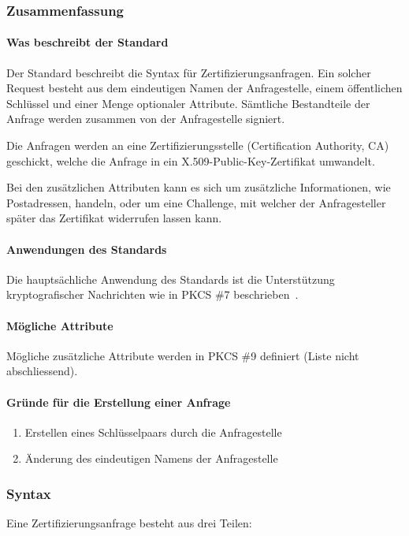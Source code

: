 \documentclass[10pt,a4paper]{article}
\begin{document}
\subsubsection{Zusammenfassung}

\paragraph{Was beschreibt der Standard}
Der Standard beschreibt die Syntax für Zertifizierungsanfragen. Ein solcher Request
besteht aus dem eindeutigen Namen der Anfragestelle, einem öffentlichen Schlüssel und
einer Menge optionaler Attribute. Sämtliche Bestandteile der Anfrage werden zusammen von
der Anfragestelle signiert.

Die Anfragen werden an eine Zertifizierungsstelle (Certification Authority, CA) geschickt,
welche die Anfrage in ein X.509-Public-Key-Zertifikat umwandelt.

Bei den zusätzlichen Attributen kann es sich um zusätzliche Informationen, wie
Postadressen, handeln, oder um eine Challenge, mit welcher der Anfragesteller später das
Zertifikat widerrufen lassen kann.

\paragraph{Anwendungen des Standards}
Die hauptsächliche Anwendung des Standards ist die Unterstützung kryptografischer
Nachrichten wie in PKCS \#7 beschrieben~\cite[S.2]{pkcs10}.

\paragraph{Mögliche Attribute}
Mögliche zusätzliche Attribute werden in PKCS \#9 definiert (Liste nicht abschliessend).

\paragraph{Gründe für die Erstellung einer Anfrage}
\begin{enumerate}
    \item Erstellen eines Schlüsselpaars durch die Anfragestelle
    \item Änderung des eindeutigen Namens der Anfragestelle
\end{enumerate}

\subsubsection{Syntax}
Eine Zertifizierungsanfrage besteht aus drei Teilen:
\end{document}

